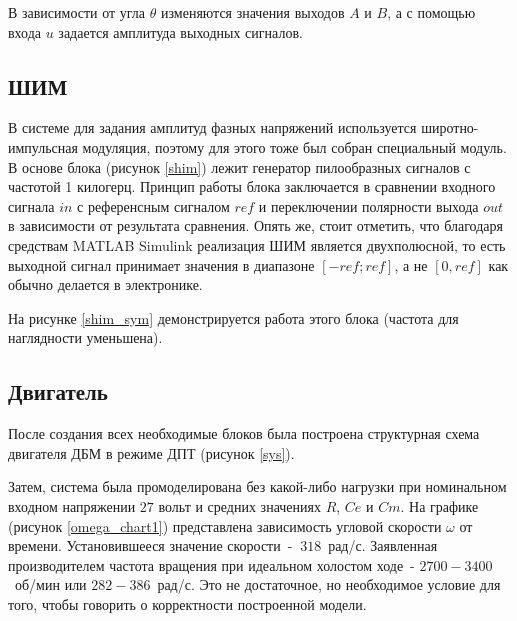 
В зависимости от угла $\theta$ изменяются значения выходов $A$ и $B$, а с помощью входа $u$ задается амплитуда
выходных сигналов.

\subsection{ШИМ}


В системе для задания амплитуд фазных напряжений используется широтно-импульсная модуляция, 
поэтому для этого тоже был собран специальный модуль.
В основе блока (рисунок \ref{shim}) лежит генератор пилообразных сигналов с частотой 1 килогерц. 
Принцип работы блока заключается в сравнении входного сигнала $in$ с референсным сигналом
$ref$ и переключении полярности выхода $out$ в зависимости от результата сравнения. Опять же, стоит отметить, что
благодаря средствам MATLAB Simulink реализация ШИМ является двухполюсной, то есть выходной сигнал принимает
значения в диапазоне $[-ref; ref]$, а не $[0, ref]$ как обычно делается в электронике.

На рисунке \ref{shim_sym} демонстрируется работа этого блока (частота для наглядности уменьшена).


\subsection{Двигатель}

После создания всех необходимые блоков была построена структурная схема двигателя ДБМ в режиме ДПТ (рисунок \ref{sys}).


Затем, система была промоделирована без какой-либо нагрузки при номинальном входном 
напряжении $27$ вольт и средних значениях $R$, $Ce$ и $Cm$. На графике (рисунок \ref{omega_chart1}) 
представлена зависимость угловой скорости $\omega$ от времени. Установившееся значение скорости~- $~318$~\mbox{рад/с}. Заявленная
производителем частота вращения при идеальном холостом ходе~- $2700-3400$~об/мин \cite{ДБМ63} или $282-386$~\mbox{рад/с}. Это 
не достаточное, но необходимое условие для того, чтобы говорить о корректности построенной модели.

